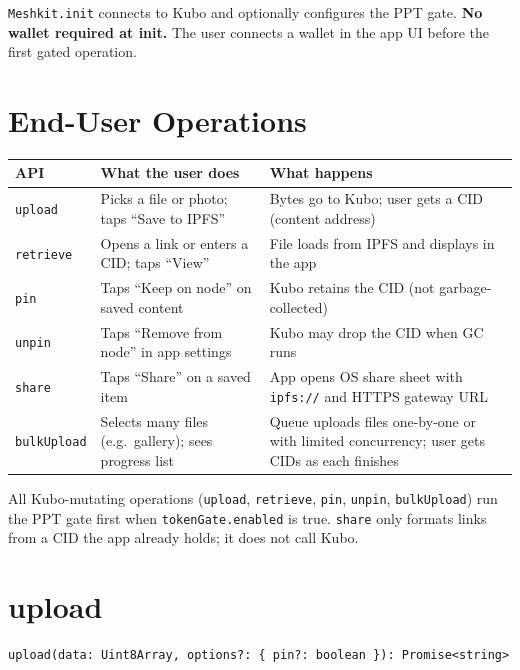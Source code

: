 \documentclass[11pt,a4paper,openany]{report}
\begin{document}
\texttt{Meshkit.init} connects to Kubo and optionally configures the PPT gate. \textbf{No wallet required at init.} The user connects a wallet in the app UI before the first gated operation.

\section{End-User Operations}

\begin{center}
\small
\begin{tabular}{@{}p{2.2cm}p{4.5cm}p{6.8cm}@{}}
\toprule
\textbf{API} & \textbf{What the user does} & \textbf{What happens} \\
\midrule
\texttt{upload} & Picks a file or photo; taps ``Save to IPFS'' & Bytes go to Kubo; user gets a CID (content address) \\
\texttt{retrieve} & Opens a link or enters a CID; taps ``View'' & File loads from IPFS and displays in the app \\
\texttt{pin} & Taps ``Keep on node'' on saved content & Kubo retains the CID (not garbage-collected) \\
\texttt{unpin} & Taps ``Remove from node'' in app settings & Kubo may drop the CID when GC runs \\
\texttt{share} & Taps ``Share'' on a saved item & App opens OS share sheet with \texttt{ipfs://} and HTTPS gateway URL \\
\texttt{bulkUpload} & Selects many files (e.g.\ gallery); sees progress list & Queue uploads files one-by-one or with limited concurrency; user gets CIDs as each finishes \\
\bottomrule
\end{tabular}
\end{center}

All Kubo-mutating operations (\texttt{upload}, \texttt{retrieve}, \texttt{pin}, \texttt{unpin}, \texttt{bulkUpload}) run the PPT gate first when \texttt{tokenGate.enabled} is true. \texttt{share} only formats links from a CID the app already holds; it does not call Kubo.

\section{upload}

\begin{lstlisting}
upload(data: Uint8Array, options?: { pin?: boolean }): Promise<string>
\end{lstlisting}
\end{document}
